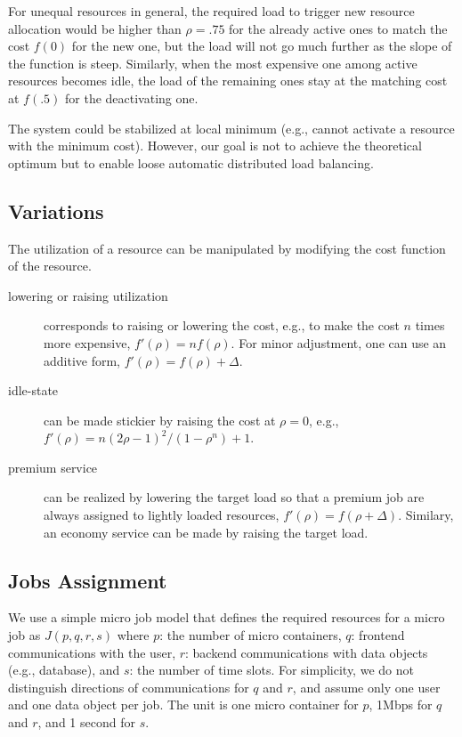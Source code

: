 For unequal resources in general, the required load to trigger new
resource allocation would be higher than $\rho = .75$ for the already
active ones to match the cost $f(0)$ for the new one, but the load
will not go much further as the slope of the function is steep.
Similarly, when the most expensive one among active resources becomes
idle, the load of the remaining ones stay at the matching cost at
$f(.5)$ for the deactivating one.

The system could be stabilized at local minimum (e.g., cannot activate
a resource with the minimum cost).
However, our goal is not to achieve the theoretical optimum but to
enable loose automatic distributed load balancing.

\subsection{Variations}
\label{sec:variation}

The utilization of a resource can be manipulated by modifying the cost
function of the resource.
\begin{description}
\item	[lowering or raising utilization] corresponds to raising or
	lowering the cost, e.g., to make the cost $n$ times
        more expensive, $f'(\rho) = n f(\rho)$.
        For minor adjustment, one can use an additive form,
        $f'(\rho) = f(\rho) + \Delta$.
\item	[idle-state] can be made stickier by raising the cost at
	  $\rho = 0$,
  	e.g., $f'(\rho) = n (2\rho - 1)^{2}/(1 - \rho^{n}) + 1$.
\item	[premium service] can be realized by lowering the target load so
        that a premium job are always assigned to lightly loaded resources, 
        $f'(\rho) = f(\rho + \Delta)$.
        Similary, an economy service can be made by raising the target load.
\end{description}

\subsection{Jobs Assignment}

We use a simple micro job model that defines the required resources
for a micro job as $J(p, q, r, s)$ where 
$p$: the number of micro containers, 
$q$: frontend communications with the user, 
$r$: backend communications with data objects (e.g., database), and
$s$: the number of time slots.
For simplicity, we do not distinguish directions of communications for
$q$ and $r$, and assume only one user and one data object per job.
The unit is one micro container for $p$, 1Mbps for $q$ and $r$, and 1
second for $s$.

